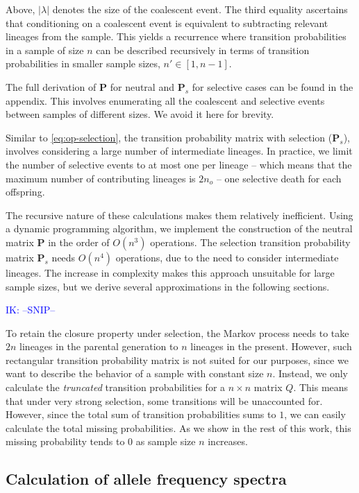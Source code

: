 \documentclass[review]{elsarticle}
\newcommand{\ikcomment}[1]{\textcolor{blue}{IK: #1}}
\begin{document}
Above, $|\lambda|$ denotes the size of the coalescent event. The third equality ascertains that
conditioning on a coalescent event is equivalent to subtracting relevant lineages from the sample.
This yields a recurrence where transition probabilities in a sample of size $n$ can be
described recursively in terms of transition probabilities in smaller sample sizes, $n' \in [1, n-1]$.

The full derivation of $\mathbf{P}$ for neutral and $\mathbf{P}_s$ for selective cases can be found
in the appendix. This involves enumerating all the coalescent and selective events between samples of
different sizes. We avoid it here for brevity.

Similar to \eqref{eq:op-selection}, the transition probability matrix with selection
($\mathbf{P}_s$), involves considering a large number of intermediate lineages. In practice, we
limit the number of selective events to at most one per lineage -- which means that the maximum number of
contributing lineages is $2n_o$ -- one selective death for each offspring.

The recursive nature of these calculations makes them relatively inefficient. Using a dynamic
programming algorithm, we implement the construction of the neutral matrix $\mathbf{P}$ in the order
of $O(n^3)$ operations. The selection transition probability matrix $\mathbf{P}_s$ needs $O(n^4)$
operations, due to the need to consider intermediate lineages. The increase in complexity makes this
approach unsuitable for large sample sizes, but we derive several approximations in the following
sections.

\ikcomment{--SNIP--}

To retain the closure property under selection, the Markov process needs to take $2n$ lineages in
the parental generation to $n$ lineages in the present. However, such rectangular transition
probability matrix is not suited for our purposes, since we want to describe the behavior of a
sample with constant size $n$. Instead, we only calculate the \textit{truncated} transition
probabilities for a $n \times n$ matrix $Q$. This means that under very strong selection, some
transitions will be unaccounted for. However, since the total sum of transition probabilities sums
to $1$, we can easily calculate the total missing probabilities. As we show in the rest of this
work, this missing probability tends to $0$ as sample size $n$ increases.


\subsection{Calculation of allele frequency spectra}
\label{subsec:afs}
\end{document}
